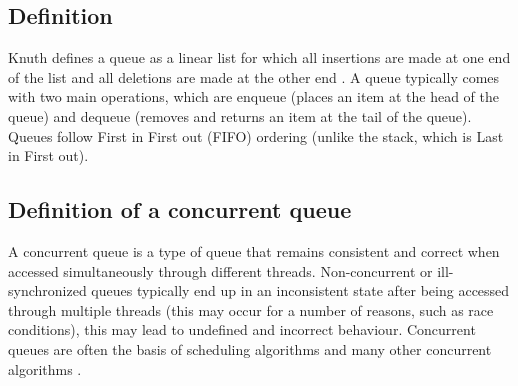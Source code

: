 \subsection{Definition}
Knuth defines a queue as a linear list for which all insertions are made at one end of the list and all deletions are made at the other end \cite{knuth1968art}. A queue typically comes with two main operations, which are enqueue (places an item at the head of the queue) and dequeue (removes and returns an item at the tail of the queue). Queues follow First in First out (FIFO) ordering (unlike the stack, which is Last in First out).
\subsection{Definition of a concurrent queue}
A concurrent queue is a type of queue that remains consistent and correct when accessed simultaneously through different threads. Non-concurrent or ill-synchronized queues typically end up in an inconsistent state after being accessed through multiple threads (this may occur for a number of reasons, such as race conditions)\cite{yahav2003automatically}, this may lead to undefined and incorrect behaviour. Concurrent queues are often the basis of scheduling algorithms and many other concurrent algorithms \cite{yahav2003automatically}.


